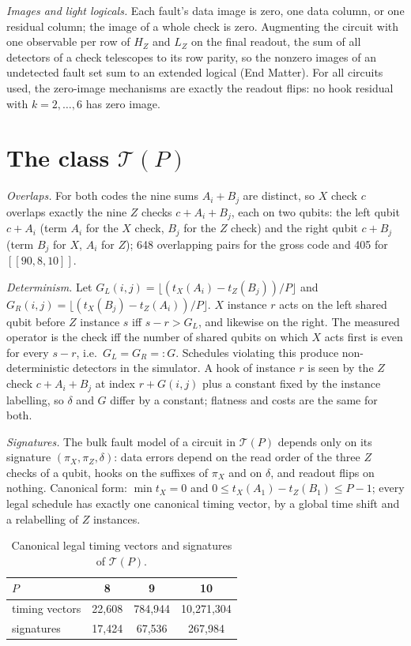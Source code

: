 \documentclass[aps,prl,twocolumn,superscriptaddress,nofootinbib]{revtex4-2}
\newif\ifshowclaimtags \showclaimtagsfalse
\newcommand{\cl}[1]{\ifshowclaimtags\textsuperscript{\textcolor{blue}{\scriptsize[#1]}}\fi}
\newcommand{\code}[1]{[[#1]]}
\newcommand{\T}{\mathcal{T}}
\begin{document}
\emph{Images and light logicals.} Each fault's data image is zero, one data column, or one
residual column; the image of a whole check is zero. Augmenting the circuit with one
observable per row of $H_Z$ and $L_Z$ on the final readout, the sum of all detectors of a
check telescopes to its row parity, so the nonzero images of an undetected fault set sum to
an extended logical (End Matter). For all circuits used, the zero-image mechanisms are
exactly the readout flips: no hook residual with $k=2,\dots,6$ has zero image.

\section{The class $\T(P)$}\label{sm:class}\cl{L-1}
\emph{Overlaps.} For both codes the nine sums $A_i+B_j$ are distinct, so $X$ check $c$
overlaps exactly the nine $Z$ checks $c+A_i+B_j$, each on two qubits: the left qubit
$c+A_i$ (term $A_i$ for the $X$ check, $B_j$ for the $Z$ check) and the right qubit $c+B_j$
(term $B_j$ for $X$, $A_i$ for $Z$); 648 overlapping pairs for the gross code and 405 for
$\code{90,8,10}$.

\emph{Determinism.} Let $G_L(i,j)=\lfloor(t_X(A_i)-t_Z(B_j))/P\rfloor$ and
$G_R(i,j)=\lfloor(t_X(B_j)-t_Z(A_i))/P\rfloor$. $X$ instance $r$ acts on the left shared
qubit before $Z$ instance $s$ iff $s-r>G_L$, and likewise on the right. The measured operator
is the check iff the number of shared qubits on which $X$ acts first is even for every
$s-r$, i.e.\ $G_L=G_R=:G$. Schedules violating this produce non-deterministic detectors in
the simulator. A hook of instance $r$ is seen by the $Z$ check $c+A_i+B_j$ at index
$r+G(i,j)$ plus a constant fixed by the instance labelling, so $\delta$ and $G$ differ by a
constant; flatness and costs are the same for both.

\emph{Signatures.} The bulk fault model of a circuit in $\T(P)$ depends only on its
signature $(\pi_X,\pi_Z,\delta)$: data errors depend on the read order of the three $Z$
checks of a qubit, hooks on the suffixes of $\pi_X$ and on $\delta$, and readout flips on
nothing. Canonical form: $\min t_X=0$ and $0\le t_X(A_1)-t_Z(B_1)\le P-1$; every legal
schedule has exactly one canonical timing vector, by a global time shift and a relabelling
of $Z$ instances.

\begin{table}[h]
\caption{Canonical legal timing vectors and signatures of $\T(P)$.}
\label{tab:counts}
\begin{ruledtabular}
\begin{tabular}{lccc}
$P$ & 8 & 9 & 10\\
\hline
timing vectors & 22,608 & 784,944 & 10,271,304\\
signatures & 17,424 & 67,536 & 267,984\\
\end{tabular}
\end{ruledtabular}
\end{table}
\end{document}
